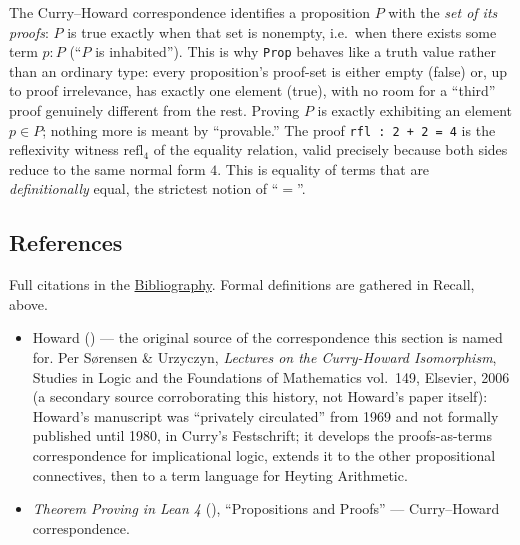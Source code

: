 \begin{mathreading}

The Curry--Howard correspondence identifies a proposition \(P\) with the \emph{set of its proofs}: \(P\) is true exactly when that set is nonempty, i.e.~when there exists some term \(p : P\) (``\(P\) is inhabited''). This is why \texttt{Prop} behaves like a truth value rather than an ordinary type: every proposition's proof-set is either empty (false) or, up to proof irrelevance, has exactly one element (true), with no room for a ``third'' proof genuinely different from the rest. Proving \(P\) is exactly exhibiting an element \(p \in P\); nothing more is meant by ``provable.'' The proof \texttt{rfl : 2 + 2 = 4} is the reflexivity witness \(\mathrm{refl}_4\) of the equality relation, valid precisely because both sides reduce to the same normal form \(4\). This is equality of terms that are \emph{definitionally} equal, the strictest notion of ``\(=\)''.

\end{mathreading}

\subsection{References}\label{sec:03-propositions-and-proofs:01-prop:4}

Full citations in the \hyperref[sec:root:bibliography:1]{Bibliography}. Formal definitions are gathered in Recall, above.

\begin{itemize}
\tightlist
\item
  Howard (\cite{Howard1980}) --- the original source of the correspondence this section is named for. Per Sørensen \& Urzyczyn, \emph{Lectures on the Curry-Howard Isomorphism}, Studies in Logic and the Foundations of Mathematics vol.~149, Elsevier, 2006 (a secondary source corroborating this history, not Howard's paper itself): Howard's manuscript was ``privately circulated'' from 1969 and not formally published until 1980, in Curry's Festschrift; it develops the proofs-as-terms correspondence for implicational logic, extends it to the other propositional connectives, then to a term language for Heyting Arithmetic.
\item
  \emph{Theorem Proving in Lean 4} (\cite{TPIL4}), ``Propositions and Proofs'' --- Curry--Howard correspondence.
\end{itemize}
